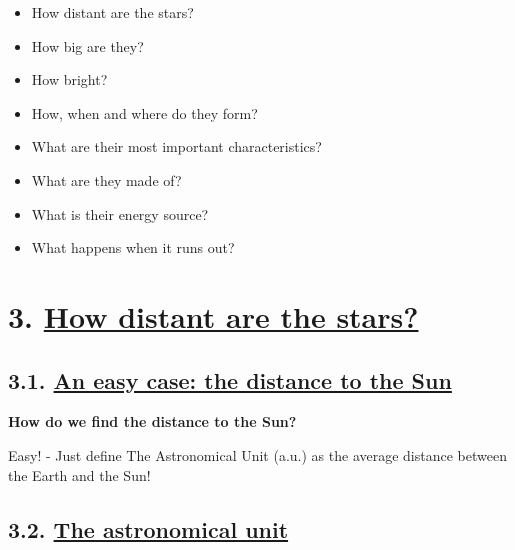 \documentclass[
  letterpaper,
  DIV=11,
  numbers=noendperiod]{scrreprt}
\providecommand{\tightlist}{%
  \setlength{\itemsep}{0pt}\setlength{\parskip}{0pt}}\usepackage{longtable,booktabs,array}
\begin{document}

\begin{itemize}
\tightlist
\item
  How distant are the stars?
\item
  How big are they?
\item
  How bright?
\item
  How, when and where do they form?
\item
  What are their most important characteristics?
\item
  What are they made of?
\item
  What is their energy source?
\item
  What happens when it runs out?
\end{itemize}


\hypertarget{how-distant-are-the-stars-1}{%
\chapter*{\texorpdfstring{3. \protect\hyperlink{toc0_}{How distant are
the
stars?}}{3. How distant are the stars?}}\label{how-distant-are-the-stars-1}}


\hypertarget{an-easy-case-the-distance-to-the-sun-1}{%
\section*{\texorpdfstring{3.1. \protect\hyperlink{toc0_}{An easy case:
the distance to the
Sun}}{3.1. An easy case: the distance to the Sun}}\label{an-easy-case-the-distance-to-the-sun-1}}


\textbf{How do we find the distance to the Sun?}

Easy! - Just define The Astronomical Unit (a.u.) as the average distance
between the Earth and the Sun!

\hypertarget{the-astronomical-unit-1}{%
\section*{\texorpdfstring{3.2. \protect\hyperlink{toc0_}{The
astronomical
unit}}{3.2. The astronomical unit}}\label{the-astronomical-unit-1}}
\end{document}
